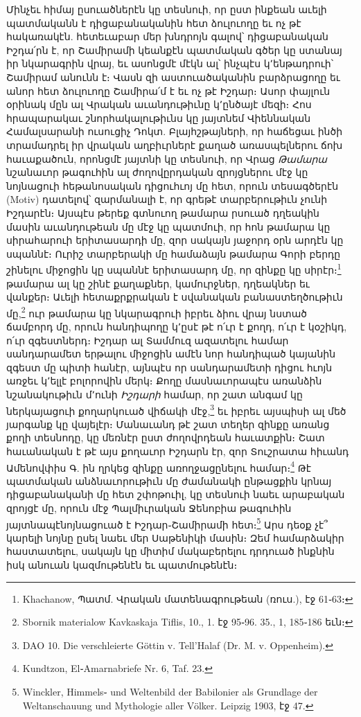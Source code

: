 \documentclass{article}
\begin{document}
{Մինչեւ հիմայ ըսուածներէն կը տեսնուի, որ ըստ ինքեան աւելի պատմականն է դիցաբանականին հետ ձուլուողը եւ ոչ թէ հակառակէն. հետեւաբար մեր խնդրոյն գալով՝ դիցաբանական Իշդա՛րն է, որ Շամիրամի կեանքէն պատմական գծեր կը ստանայ իր նկարագրին վրայ, եւ ասոնցմէ մէկն ալ՝ ինչպէս կ՚ենթադրուի՝ Շամիրամ անունն է։ Վասն զի աստուածականին բարձրացողը եւ անոր հետ ձուլուողը Շամիրա՛մ է եւ ոչ թէ Իշդար։ Ասոր փայլուն օրինակ մըն ալ Վրական աւանդութիւնը կ՚ընծայէ մեզի։ Հոս հրապարակաւ շնորհակալութիւնս կը յայտնեմ Վիեննական Համալսարանի ուսուցիչ Դոկտ. Բլայհշթայների, որ հաճեցաւ ինծի տրամադրել իր վրական աղբիւրներէ քաղած առասպելներու ճոխ հաւաքածուն, որոնցմէ յայտնի կը տեսնուի, որ Վրաց \emph{Թամարա} նշանաւոր թագուհին ալ ժողովըրդական զրոյցներու մէջ կը նոյնացուի հեթանոսական դիցուհւոյ մը հետ, որուն տեսագծերէն (Motiv) դատելով՝ զարմանալի է, որ գրեթէ տարբերութիւն չունի Իշդարէն։ Այսպէս թերեք գտնուող թամարա րսուած դղեակին մասին աւանդութեան մը մէջ կը պատմուի, որ հոն թամարա կը սիրահարուի երիտասարդի մը, զոր սակայն յաջորդ օրն արդէն կը սպաննէ։ Ուրիշ տարբերակի մը համաձայն թամարա Գորի բերդը շինելու միջոցին կը սպաննէ երիտասարդ մը, որ զինքը կը սիրէր։\footnote{Khachanow, Պատմ. Վրական մատենագրութեան (ռուս.), էջ 61֊63։} թամարա ալ կը շինէ քաղաքներ, կամուրջներ, դղեակներ եւ վանքեր։ Աւելի հետաքրքրական է սվանական բանաստեղծութիւն մը,\footnote{Sbornik materialow Kavkaskaja Tiflis, 10., 1. էջ 95֊96. 35., 1, 185֊186 եւն։} ուր թամարա կը նկարագրուի իբրեւ ձիու վրայ նստած ճամբորդ մը, որուն հանդիպողը կ՚ըսէ թէ ո՛ւր է քողդ, ո՛ւր է կօշիկդ, ո՛ւր զգեստներդ։ Իշդար ալ Տամմուզ ազատելու համար սանդարամետ երթալու միջոցին ամէն նոր հանդիպած կայանին զգեստ մը պիտի հանէր, այնպէս որ սանդարամետի դիցու հւոյն առջեւ կ՚ելլէ բոլորովին մերկ։ Քողը մասնաւորապէս առանձին նշանակութիւն մ՚ունի \emph{Իշդարի} համար, որ շատ անգամ կը ներկայացուի քողարկուած վիճակի մէջ,\footnote{DAO 10. Die verschleierte Göttin v. Tell'Halaf (Dr. M. v. Oppenheim).} եւ իբրեւ այսպիսի ալ մեծ յարգանք կը վայելէր։ Մանաւանդ թէ շատ տեղեր զինքը առանց քողի տեսնոդը, կը մեռնէր ըստ ժողովրդեան հաւատքին։ Շատ հաւանական է թէ այս քողաւոր Իշդարն էր, զոր Տուշրատա հիւանդ Ամենովփիս Գ. ին ղրկեց զինքը առողջացընելու համար։\footnote{Kundtzon, El֊Amarnabriefe Nr. 6, Taf. 23.} Թէ պատմական անձնաւորութիւն մը ժամանակի ընթացքին կրնայ դիցաբանականի մը հետ շփոթուիլ, կը տեսնուի նաեւ արաբական զրոյցէ մը, որուն մէջ Պալմիւրական Ջենոբիա թագուհին յայտնապէնոյնացուած է Իշդար֊Շամիրամի հետ։\footnote{Winckler, Himmels֊ und Weltenbild der Babilonier als Grundlage der Weltanschauung und Mythologie aller Völker. Leipzig 1903, էջ 47.} Արս դեօք չէ՞ կարելի նոյնը ըսել նաեւ մեր Սաթենիկի մասին։ Զեմ համարձակիր հաստատելու, սակայն կը միտիմ մակաբերելու դրդուած ինքնին իսկ անուան կազմութենէն եւ պատմութենէն։

}
\end{document}
